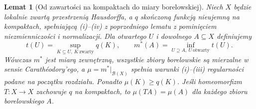 \documentclass[11pt,a4paper,oneside]{book}
\numberwithin{equation}{chapter}
\theoremstyle{plain}
\newtheorem{lemat}[twierdzenie]{Lemat}
\theoremstyle{definition}
\theoremstyle{remark}
\begin{document}
\begin{lemat}[Od zawartości na kompaktach do miary borelowskiej]
\label{lem:haar-content-to-measure-23}
Niech $X$ będzie lokalnie zwartą przestrzenią Hausdorffa,
a $q$ skończoną funkcją nieujemną na kompaktach,
spełniającą (i)--(iv) z poprzedniego lematu z pominięciem
niezmienniczości i normalizacji. Dla otwartego $U$
i dowolnego $A\subseteq X$ definiujemy
\begin{equation}\label{eq:haar-from-content-23}
 t(U)=\sup_{K\subseteq U,\ K\ \mathrm{zwarty}}q(K),
 \qquad
 m^*(A)=\inf_{U\supseteq A,\ U\ \mathrm{otwarty}}t(U).
\end{equation}
Wówczas $m^*$ jest miarą zewnętrzną,
wszystkie zbiory borelowskie są mierzalne w sensie
Carathéodory'ego, a $\mu=m^*|_{\mathcal B(X)}$
spełnia warunki (i)--(iii) regularności podane
na początku rozdziału. Ponadto $\mu(K)\ge q(K)$.
Jeśli homeomorfizm $T:X\to X$ zachowuje $q$ na
kompaktach, to $\mu(TA)=\mu(A)$ dla każdego
zbioru borelowskiego $A$.
\end{lemat}
\end{document}
